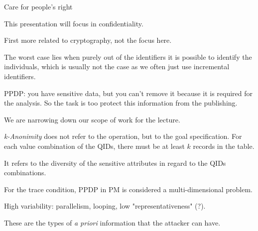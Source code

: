 
\renewcommand\slidesfile{lecture_13_privacy_preservation.pdf}

\nextslides[slide=2] 

Care for people's right

\nextslides

This presentation will focus in confidentiality.

\nextslides

First more related to cryptography, not the focus here.

\nextslides[slide=6] 

The worst case lies when purely out of the identifiers it is possible to identify the individuals, which is usually not the case as we often just use incremental identifiers.

\nextslides[slide=9] 

PPDP: you have sensitive data, but you can't remove it because it is required for the analysis. So the task is too protect this information from the publishing.

\nextslides

We are narrowing down our scope of work for the lecture.

\nextslides

\nextslides[slide=13] 

\nextslides

\nextslides

\nextslides

\emph{k-Anonimity} does not refer to the operation, but to the goal specification. For each value combination of the QIDs, there must be at least $k$ records in the table.

\nextslides

It refers to the diversity of the sensitive attributes in regard to the QIDs combinations.

\nextslides

\nextslides

For the trace condition, PPDP in PM is considered a multi-dimensional problem.

\nextslides

\nextslides

High variability: parallelism, looping, low "representativeness" (?).

\nextslides[until=26] 

These are the types of \emph{a priori} information that the attacker can have.

